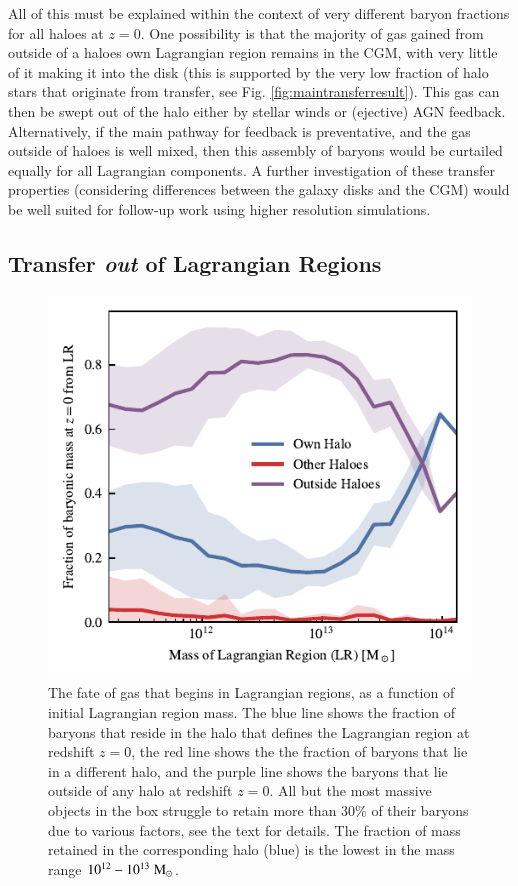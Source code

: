 All of this must be explained within the context of very different baryon
fractions for all haloes at $z=0$. One possibility is that the majority of
gas gained from outside of a haloes own Lagrangian region remains in the CGM,
with very little of it making it into the disk (this is supported by the very
low fraction of halo stars that originate from transfer, see Fig.
\ref{fig:maintransferresult}). This gas can then be swept out of the halo
either by stellar winds or (ejective) AGN feedback. Alternatively, if the
main pathway for feedback is preventative, and the gas outside of haloes is
well mixed, then this assembly of baryons would be curtailed equally for all
Lagrangian components. A further investigation of these transfer properties
(considering differences between the galaxy disks and the CGM) would be well
suited for follow-up work using higher resolution simulations.

\subsection{Transfer \emph{out} of Lagrangian Regions}

\begin{figure}
	\centering
	\includegraphics{figures/s50j7kAHF/inverse_component_fraction.pdf}
	\vspace{-0.7cm}
 \caption{The fate of gas that begins in Lagrangian regions, as a function of
 initial Lagrangian region mass. The blue line shows the fraction of baryons
 that reside in the halo that defines the Lagrangian region at redshift
 $z=0$, the red line shows the the fraction of baryons that lie in a
 different halo, and the purple line shows the baryons that lie outside of
 any halo at redshift $z=0$. All but the most massive objects in the box
 struggle to retain more than 30\% of their baryons due to various factors,
 see the text for details. The fraction of mass retained in the corresponding
 halo (blue) is the lowest in the mass range $10^{12} - 10^{13}\;{\rm M}_{\odot}{}$.}

	\label{fig:transferoutoflrs}
\end{figure}



